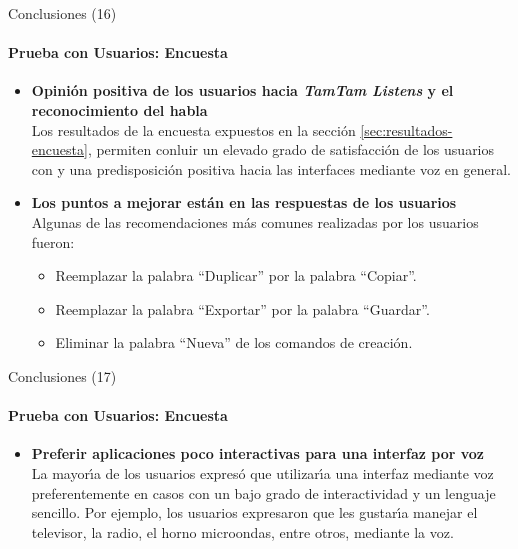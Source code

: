 \begin{frame}{Conclusiones (16)}
\framesubtitle{Prueba con Usuarios: Encuesta}
\begin{itemize}

\item{\textbf{Opini\'on positiva de los usuarios hacia \emph{TamTam Listens} y el reconocimiento del habla\\}}
Los resultados de la encuesta expuestos en la secci\'on \ref{sec:resultados-encuesta},
permiten conluir un elevado grado de satisfacci\'on de los usuarios con  y una
predisposici\'on positiva hacia las interfaces mediante voz en general.

\item{\textbf{Los puntos a mejorar est\'an en las respuestas de los usuarios\\}}
Algunas de las recomendaciones m\'as comunes realizadas por los usuarios fueron:

\begin{itemize}
    \item Reemplazar la palabra ``Duplicar'' por la palabra ``Copiar''. 
    \item Reemplazar la palabra ``Exportar'' por la palabra ``Guardar''.
    \item Eliminar la palabra ``Nueva'' de los comandos de creaci\'on.
\end{itemize}
\end{itemize}
\end{frame}

\begin{frame}{Conclusiones (17)}
\framesubtitle{Prueba con Usuarios: Encuesta}
\begin{itemize}

\item{\textbf{Preferir aplicaciones poco interactivas para una interfaz por voz\\}}
La mayor{{\'\i}}a de los usuarios expres\'o que utilizar{{\'\i}}a una interfaz mediante voz
preferentemente en casos con un bajo grado de interactividad y un lenguaje sencillo.
Por ejemplo, los usuarios expresaron que les gustar{{\'\i}}a manejar el televisor, la radio, 
el horno microondas, entre otros, mediante la voz.
\end{itemize}
\end{frame}
